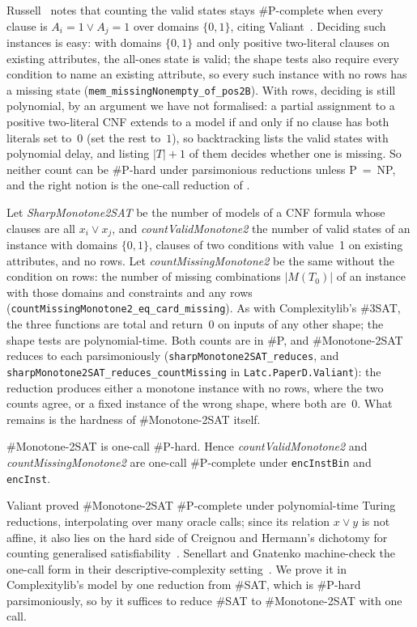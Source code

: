 \documentclass[a4paper,UKenglish,cleveref,autoref,thm-restate]{lipics-v2021}
\begin{document}
Russell~\cite{PaperA} notes that counting the valid states stays \#P-complete when every
clause is $A_i = 1 \lor A_j = 1$ over domains $\{0,1\}$, citing
Valiant~\cite{Valiant1979enumeration}. Deciding such instances is easy: with domains
$\{0,1\}$ and only positive two-literal clauses on existing attributes, the all-ones state is
valid; the shape tests also require every condition to name an existing attribute, so every
such instance with no rows has a missing state (\lstinline{mem_missingNonempty_of_pos2B}). With
rows, deciding is still polynomial, by an argument we have not formalised: a partial assignment
to a positive two-literal CNF extends to a model if and only if no clause has both literals set
to~$0$ (set the rest to~$1$), so backtracking lists the valid states with polynomial delay, and
listing $|T|+1$ of them decides whether one is missing. So neither count can be \#P-hard under
parsimonious reductions unless P~=~NP, and the right notion is the one-call reduction of
.

Let \textit{SharpMonotone2SAT} be the number of models of a CNF formula whose clauses are all
$x_i \lor x_j$, and \textit{countValidMonotone2} the number of valid states of an instance with
domains $\{0,1\}$, clauses of two conditions with value~1 on existing attributes, and no rows. Let
\textit{countMissingMonotone2} be the same without the condition on rows: the number of missing
combinations $|M(T_0)|$ of an instance with those domains and constraints and any rows
(\lstinline{countMissingMonotone2_eq_card_missing}). As with Complexitylib's \#3SAT, the three
functions are total and return~$0$ on inputs of any other shape; the shape tests are
polynomial-time. Both counts are in \#P, and \#Monotone-2SAT reduces to each
parsimoniously (\lstinline{sharpMonotone2SAT_reduces}, and
\lstinline{sharpMonotone2SAT_reduces_countMissing} in \lstinline{Latc.PaperD.Valiant}): the reduction produces either a monotone instance with no rows, where the two counts agree, or a fixed
instance of the wrong shape, where both are~$0$. What remains is the hardness of \#Monotone-2SAT
itself.

\begin{theorem}
\label{thm:valiant}
\#Monotone-2SAT is one-call \#P-hard. Hence \textit{countValidMonotone2} and
\textit{countMissingMonotone2} are one-call \#P-complete under \lstinline{encInstBin} and
\lstinline{encInst}.
\end{theorem}

Valiant proved \#Monotone-2SAT \#P-complete under polynomial-time Turing reductions,
interpolating over many oracle calls; since its relation $x \lor y$ is not affine, it also lies on
the hard side of Creignou and Hermann's dichotomy for counting generalised
satisfiability~\cite{CreignouHermann1996}. Senellart and Gnatenko machine-check the one-call form in their
descriptive-complexity setting~\cite{SenellartGnatenko2026}. We prove it in
Complexitylib's model by one reduction from \#SAT, which is \#P-hard parsimoniously, so by
 it suffices to reduce \#SAT to \#Monotone-2SAT with one call.
\end{document}
